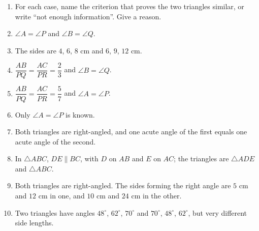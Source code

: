 \documentclass[11pt,a4paper]{article}
\theoremstyle{brand}
\theoremstyle{branddef}
\newcommand{\tr}{\triangle}
\newenvironment{exercise}[1]
  {\par\medskip\Needspace{7\baselineskip}\noindent{\large\bfseries\color{accent}Exercise #1}
   \par\smallskip
   \begin{enumerate}[leftmargin=*,itemsep=4pt]}
  {\end{enumerate}}
\begin{document}
\begin{exercise}{2G}
  \item[] \hspace*{-\leftmargin}\parbox[t]{\textwidth}{For each case, name the criterion that proves the two triangles similar, or write ``not enough information''. Give a reason.}
  \item $\angle A=\angle P$ and $\angle B=\angle Q$.
  \item The sides are $4$, $6$, $8$ cm and $6$, $9$, $12$ cm.
  \item $\dfrac{AB}{PQ}=\dfrac{AC}{PR}=\dfrac23$ and $\angle B=\angle Q$.
  \item $\dfrac{AB}{PQ}=\dfrac{AC}{PR}=\dfrac57$ and $\angle A=\angle P$.
  \item Only $\angle A=\angle P$ is known.
  \item Both triangles are right-angled, and one acute angle of the first equals one acute angle of the second.
  \item In $\tr ABC$, $DE\parallel BC$, with $D$ on $AB$ and $E$ on $AC$; the triangles are $\tr ADE$ and $\tr ABC$.
  \item Both triangles are right-angled. The sides forming the right angle are $5$ cm and $12$ cm in one, and $10$ cm and $24$ cm in the other.
  \item Two triangles have angles $48^\circ$, $62^\circ$, $70^\circ$ and $70^\circ$, $48^\circ$, $62^\circ$, but very different side lengths.
\end{exercise}
\end{document}
